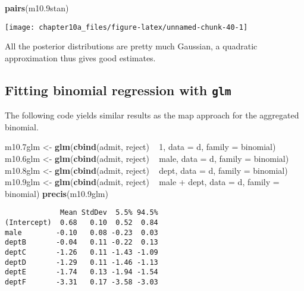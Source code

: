 \documentclass[]{tufte-handout}
\newenvironment{Shaded}{}{}
\newcommand{\KeywordTok}[1]{\textcolor[rgb]{0.00,0.44,0.13}{\textbf{#1}}}
\newcommand{\DataTypeTok}[1]{\textcolor[rgb]{0.56,0.13,0.00}{#1}}
\newcommand{\DecValTok}[1]{\textcolor[rgb]{0.25,0.63,0.44}{#1}}
\newcommand{\FloatTok}[1]{\textcolor[rgb]{0.25,0.63,0.44}{#1}}
\newcommand{\StringTok}[1]{\textcolor[rgb]{0.25,0.44,0.63}{#1}}
\newcommand{\OperatorTok}[1]{\textcolor[rgb]{0.40,0.40,0.40}{#1}}
\newcommand{\NormalTok}[1]{#1}
\begin{document}
\begin{Shaded}
\begin{Highlighting}[]
\KeywordTok{pairs}\NormalTok{(m10}\FloatTok{.9}\NormalTok{stan)}
\end{Highlighting}
\end{Shaded}

\texttt{[image: chapter10a\_files/figure-latex/unnamed-chunk-40-1]}

All the posterior distributions are pretty much Gaussian, a quadratic
approximation thus gives good estimates.

\subsection{\texorpdfstring{Fitting binomial regression with
\texttt{glm}}{Fitting binomial regression with glm}}\label{fitting-binomial-regression-with-glm}

The following code yields similar results as the map approach for the
aggregated binomial.

\begin{Shaded}
\begin{Highlighting}[]
\NormalTok{m10}\FloatTok{.7}\NormalTok{glm <-}\StringTok{ }\KeywordTok{glm}\NormalTok{(}\KeywordTok{cbind}\NormalTok{(admit, reject) }\OperatorTok{~}\StringTok{ }\DecValTok{1}\NormalTok{, }\DataTypeTok{data =}\NormalTok{ d, }
    \DataTypeTok{family =}\NormalTok{ binomial)}
\NormalTok{m10}\FloatTok{.6}\NormalTok{glm <-}\StringTok{ }\KeywordTok{glm}\NormalTok{(}\KeywordTok{cbind}\NormalTok{(admit, reject) }\OperatorTok{~}\StringTok{ }\NormalTok{male, }\DataTypeTok{data =}\NormalTok{ d, }
    \DataTypeTok{family =}\NormalTok{ binomial)}
\NormalTok{m10}\FloatTok{.8}\NormalTok{glm <-}\StringTok{ }\KeywordTok{glm}\NormalTok{(}\KeywordTok{cbind}\NormalTok{(admit, reject) }\OperatorTok{~}\StringTok{ }\NormalTok{dept, }\DataTypeTok{data =}\NormalTok{ d, }
    \DataTypeTok{family =}\NormalTok{ binomial)}
\NormalTok{m10}\FloatTok{.9}\NormalTok{glm <-}\StringTok{ }\KeywordTok{glm}\NormalTok{(}\KeywordTok{cbind}\NormalTok{(admit, reject) }\OperatorTok{~}\StringTok{ }\NormalTok{male }\OperatorTok{+}\StringTok{ }
\StringTok{    }\NormalTok{dept, }\DataTypeTok{data =}\NormalTok{ d, }\DataTypeTok{family =}\NormalTok{ binomial)}
\KeywordTok{precis}\NormalTok{(m10}\FloatTok{.9}\NormalTok{glm)}
\end{Highlighting}
\end{Shaded}

\begin{verbatim}
             Mean StdDev  5.5% 94.5%
(Intercept)  0.68   0.10  0.52  0.84
male        -0.10   0.08 -0.23  0.03
deptB       -0.04   0.11 -0.22  0.13
deptC       -1.26   0.11 -1.43 -1.09
deptD       -1.29   0.11 -1.46 -1.13
deptE       -1.74   0.13 -1.94 -1.54
deptF       -3.31   0.17 -3.58 -3.03
\end{verbatim}
\end{document}
